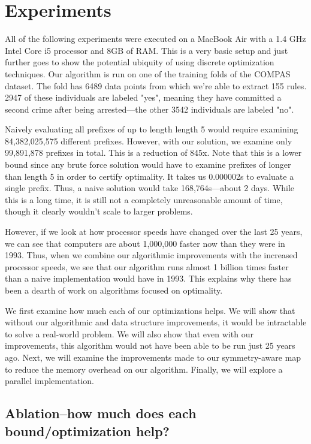 \chapter{Experiments}

All of the following experiments were executed on a MacBook Air with a 1.4 GHz Intel Core i5 processor and 8GB of RAM.
This is a very basic setup and just further goes to show the potential ubiquity of using discrete optimization techniques.
Our algorithm is run on one of the training folds of the COMPAS dataset.
The fold has 6489 data points from which we're able to extract 155 rules.
2947 of these individuals are labeled "yes", meaning they have committed a second crime after being arrested---the other 3542 individuals are labeled "no".

Naively evaluating all prefixes of up to length length 5 would require examining 84,382,025,575 different prefixes.
However, with our solution, we examine only 99,891,878 prefixes in total.
This is a reduction of 845x.
Note that this is a lower bound since any brute force solution would have to examine prefixes of longer than length 5 in order to certify optimality.
It takes us 0.000002s to evaluate a single prefix.
Thus, a naive solution would take 168,764s---about 2 days.
While this is a long time, it is still not a completely unreasonable amount of time, though it clearly wouldn't scale to larger problems.

However, if we look at how processor speeds have changed over the last 25 years, we can see that computers are about 1,000,000 faster now than they were in 1993. \cite{Supercomputer}
Thus, when we combine our algorithmic improvements with the increased processor speeds, we see that our algorithm runs almost 1 billion times faster than a naive implementation would have in 1993.
This explains why there has been a dearth of work on algorithms focused on optimality.

We first examine how much each of our optimizations helps.
We will show that without our algorithmic and data structure improvements, it would be intractable to solve a real-world problem.
We will also show that even with our improvements, this algorithm would not have been able to be run just 25 years ago.
Next, we will examine the improvements made to our symmetry-aware map to reduce the memory overhead on our algorithm.
Finally, we will explore a parallel implementation.

\section{Ablation--how much does each bound/optimization help?}

